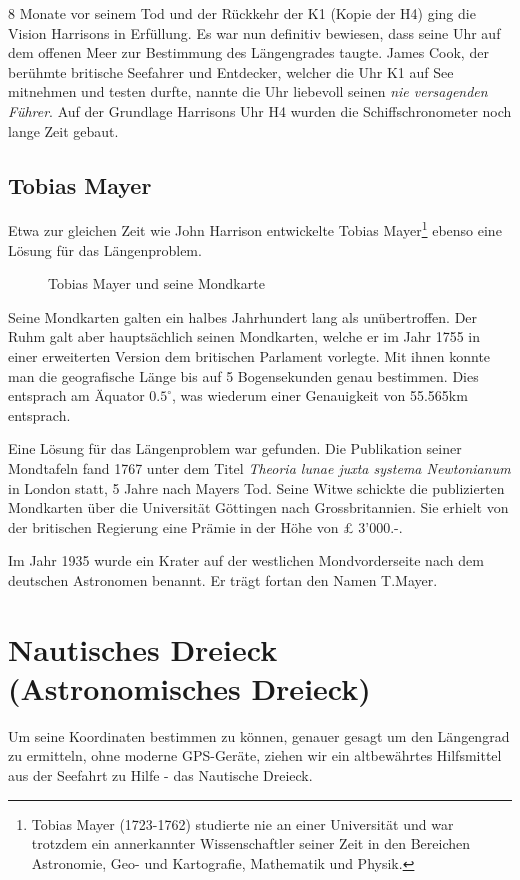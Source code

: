 \begin{refsection}
8 Monate vor seinem Tod und der Rückkehr der K1 (Kopie der H4) ging die Vision Harrisons in Erfüllung. Es war nun definitiv bewiesen, dass seine Uhr auf dem offenen Meer zur Bestimmung des Längengrades taugte. James Cook, der berühmte britische Seefahrer und Entdecker, welcher die Uhr K1 auf See mitnehmen und testen durfte, nannte die Uhr liebevoll seinen \textit{nie versagenden Führer}.
Auf der Grundlage Harrisons Uhr H4 wurden die Schiffschronometer noch lange Zeit gebaut.



\subsection{Tobias Mayer}
Etwa zur gleichen Zeit wie John Harrison entwickelte Tobias Mayer\footnote{%
Tobias Mayer (1723-1762) studierte nie an einer Universität und war trotzdem ein annerkannter Wissenschaftler seiner Zeit in den Bereichen Astronomie, Geo- und Kartografie, Mathematik und Physik.}
ebenso eine Lösung für das Längenproblem.

\begin{figure}[!htb]
\centering
\quad \quad
\centering
\caption{Tobias Mayer und seine Mondkarte} 
\end{figure}

Seine Mondkarten galten ein halbes Jahrhundert lang als unübertroffen. Der Ruhm galt aber hauptsächlich seinen Mondkarten, welche er im Jahr 1755 in einer erweiterten Version dem britischen Parlament vorlegte.
Mit ihnen konnte man die geografische Länge bis auf 5 Bogensekunden genau bestimmen. Dies entsprach am Äquator $0.5 ^{\circ}$, was wiederum einer Genauigkeit von 55.565km entsprach.

Eine Lösung für das Längenproblem war gefunden. Die Publikation seiner Mondtafeln fand 1767 unter dem Titel \textit{Theoria lunae juxta systema Newtonianum} in London statt, 5 Jahre nach Mayers Tod. 
Seine Witwe schickte die publizierten Mondkarten über die Universität Göttingen nach Grossbritannien. Sie erhielt von der britischen Regierung eine Prämie in der Höhe von £ 3’000.-.

Im Jahr 1935 wurde ein Krater auf der westlichen Mondvorderseite nach dem deutschen Astronomen benannt. Er trägt fortan den Namen T.Mayer.

\section{Nautisches Dreieck (Astronomisches Dreieck)}
Um seine Koordinaten bestimmen zu können, genauer gesagt um den Längengrad zu ermitteln, ohne moderne GPS-Geräte, ziehen wir ein altbewährtes Hilfsmittel aus der Seefahrt zu Hilfe - das Nautische Dreieck.


\end{refsection}

